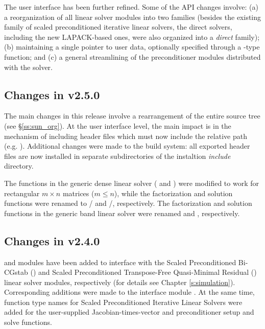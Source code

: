 The user interface has been further refined. Some of the API changes involve:
(a) a reorganization of all linear solver modules into two families (besides
the existing family of scaled preconditioned iterative linear solvers,
the direct solvers, including the new LAPACK-based ones, were also organized
into a {\em direct} family); (b) maintaining a single pointer to user data,
optionally specified through a -type function; and (c) a general
streamlining of the preconditioner modules distributed with the solver.

\subsection*{Changes in v2.5.0}

The main changes in this release involve a rearrangement of the entire
{\sundials} source tree (see \S\ref{ss:sun_org}). At the user interface
level, the main impact is in the mechanism of including {\sundials} header
files which must now include the relative path (e.g. ).
Additional changes were made to the build system: all exported header files are
now installed in separate subdirectories of the instaltion {\em include} directory.

The functions in the generic dense linear solver ( and
) were modified to work for rectangular $m \times n$
matrices ($m \le n$), while the factorization and solution functions were
renamed to / and /,
respectively.
The factorization and solution functions in the generic band linear solver were
renamed  and , respectively.

\subsection*{Changes in v2.4.0}

{\cvspbcg} and {\cvsptfqmr} modules have been added to interface with the
Scaled Preconditioned Bi-CGstab ({\spbcg}) and Scaled Preconditioned
Transpose-Free Quasi-Minimal Residual ({\sptfqmr}) linear solver modules,
respectively (for details see Chapter \ref{s:simulation}). Corresponding
additions were made to the {\F} interface module {\fcvode}.
At the same time, function type names for Scaled Preconditioned Iterative
Linear Solvers were added for the user-supplied Jacobian-times-vector and
preconditioner setup and solve functions.

